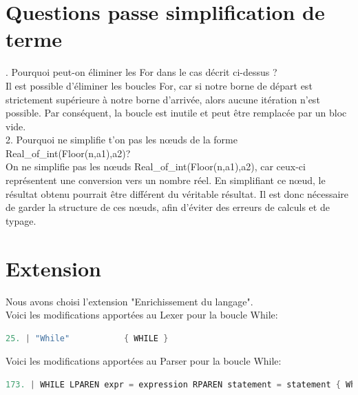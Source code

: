 \documentclass{report}
\begin{document}
    \newpage

    \section{Questions passe simplification de terme}

    . Pourquoi peut-on éliminer les For dans le cas décrit ci-dessus ? \\

    Il est possible d'éliminer les boucles For, car si notre borne de départ est strictement supérieure à notre borne d'arrivée, alors aucune itération n'est possible. Par conséquent, la boucle est inutile et peut être remplacée par un bloc vide. \\

    2. Pourquoi ne simplifie t'on pas les nœuds de la forme Real\_of\_int(Floor(n,a1),a2)? \\

    On ne simplifie pas les nœuds Real\_of\_int(Floor(n,a1),a2), car ceux-ci représentent une conversion vers un nombre réel. En simplifiant ce nœud, le résultat obtenu pourrait être différent du véritable résultat. Il est donc nécessaire de garder la structure de ces nœuds, afin d'éviter des erreurs de calculs et de typage.\\

    \section{Extension}

    Nous avons choisi l'extension "Enrichissement du langage".\\

    Voici les modifications apportées au Lexer pour la boucle While: \\

    \begin{lstlisting}[language=C, basicstyle=\ttfamily]
        25. | "While"           { WHILE }
    \end{lstlisting}

    Voici les modifications apportées au Parser pour la boucle While: \\

    \begin{lstlisting}[language=C, basicstyle=\ttfamily]
        173. | WHILE LPAREN expr = expression RPAREN statement = statement { While(expr, statement, Annotation.create $loc) }
    \end{lstlisting}
\end{document}
